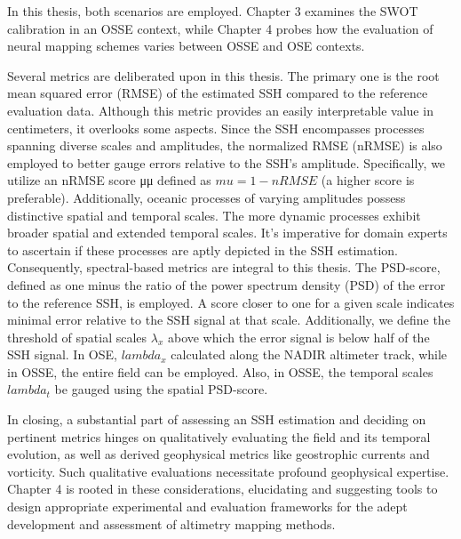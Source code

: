 \begin{bibunit}
In this thesis, both scenarios are employed. Chapter 3 examines the SWOT calibration in an OSSE context, while Chapter 4 probes how the evaluation of neural mapping schemes varies between OSSE and OSE contexts.

Several metrics are deliberated upon in this thesis. The primary one is the root mean squared error (RMSE) of the estimated SSH compared to the reference evaluation data. Although this metric provides an easily interpretable value in centimeters, it overlooks some aspects. Since the SSH encompasses processes spanning diverse scales and amplitudes, the normalized RMSE (nRMSE) is also employed to better gauge errors relative to the SSH's amplitude. Specifically, we utilize an nRMSE score μμ defined as $mu=1−nRMSE$ (a higher score is preferable). Additionally, oceanic processes of varying amplitudes possess distinctive spatial and temporal scales. The more dynamic processes exhibit broader spatial and extended temporal scales. It's imperative for domain experts to ascertain if these processes are aptly depicted in the SSH estimation. Consequently, spectral-based metrics are integral to this thesis. The PSD-score, defined as one minus the ratio of the power spectrum density (PSD) of the error to the reference SSH, is employed. A score closer to one for a given scale indicates minimal error relative to the SSH signal at that scale. Additionally, we define the threshold of spatial scales $\lambda_x$ above which the error signal is below half of the SSH signal. In OSE, $lambda_x$ calculated along the NADIR altimeter track, while in OSSE, the entire field can be employed. Also, in OSSE, the temporal scales $lambda_t$ be gauged using the spatial PSD-score.

In closing, a substantial part of assessing an SSH estimation and deciding on pertinent metrics hinges on qualitatively evaluating the field and its temporal evolution, as well as derived geophysical metrics like geostrophic currents and vorticity. Such qualitative evaluations necessitate profound geophysical expertise. Chapter 4 is rooted in these considerations, elucidating and suggesting tools to design appropriate experimental and evaluation frameworks for the adept development and assessment of altimetry mapping methods.




\end{bibunit}
